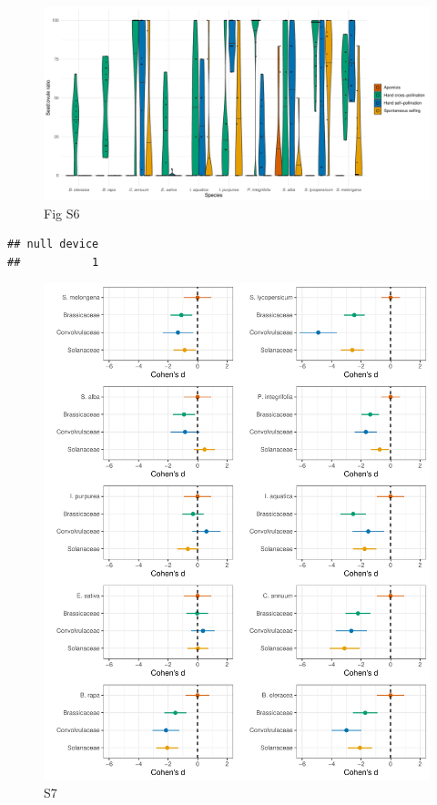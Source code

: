 \documentclass[
  12pt,
]{article}
\begin{document}
\newpage

\begin{figure}

{\centering \includegraphics[width=1\linewidth]{Supp_Material_files/figure-latex/unnamed-chunk-8-1} 

}

\caption{Fig S6}\label{fig:unnamed-chunk-8}
\end{figure}

\begin{verbatim}
## null device 
##           1
\end{verbatim}

\newpage

\begin{figure}
\centering
\includegraphics{Supp_Material_files/figure-latex/unnamed-chunk-9-1.pdf}
\caption{S7}
\end{figure}
\end{document}
